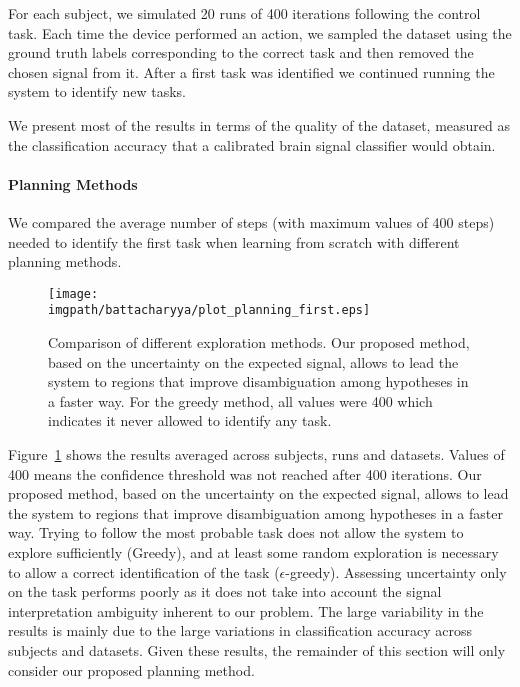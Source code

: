 For each subject, we simulated 20 runs of 400 iterations following the control task. Each time the device performed an action, we sampled the dataset using the ground truth labels corresponding to the correct task and then removed the chosen signal from it. After a first task was identified we continued running the system to identify new tasks. 

We present most of the results in terms of the quality of the dataset, measured as the classification accuracy that a calibrated brain signal classifier would obtain.

\paragraph{Planning Methods}

We compared the average number of steps (with maximum values of 400 steps) needed to identify the first task when learning from scratch with different planning methods.

\begin{figure}[!htbp]
    \centering
    \texttt{[image: \\imgpath/battacharyya/plot\_planning\_first.eps]}
    \caption{Comparison of different exploration methods. Our proposed method, based on the uncertainty on the expected signal, allows to lead the system to regions that improve disambiguation among hypotheses in a faster way. For the greedy method, all values were 400 which indicates it never allowed to identify any task.}
    \label{fig:overlapcompplan}
\end{figure}

Figure~\ref{fig:overlapcompplan} shows the results averaged across subjects, runs and datasets. Values of 400 means the confidence threshold was not reached after 400 iterations. Our proposed method, based on the uncertainty on the expected signal, allows to lead the system to regions that improve disambiguation among hypotheses in a faster way. Trying to follow the most probable task does not allow the system to explore sufficiently (Greedy), and at least some random exploration is necessary to allow a correct identification of the task ($\epsilon$-greedy). Assessing uncertainty only on the task performs poorly as it does not take into account the signal interpretation ambiguity inherent to our problem. The large variability in the results is mainly due to the large variations in classification accuracy across subjects and datasets. Given these results, the remainder of this section will only consider our proposed planning method.


